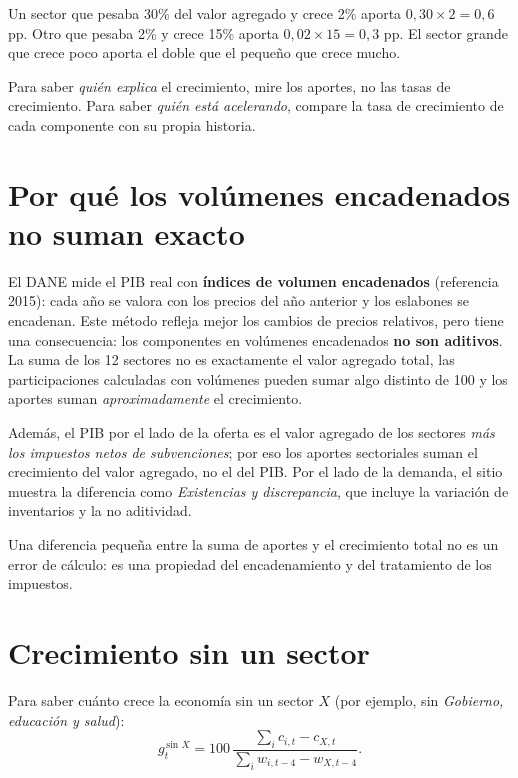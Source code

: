 \begin{dato}
Un sector que pesaba 30\% del valor agregado y crece 2\% aporta $0{,}30\times2=0{,}6$ pp. Otro que pesaba 2\% y
crece 15\% aporta $0{,}02\times15=0{,}3$ pp. El sector grande que crece poco aporta el doble que el pequeño que crece
mucho.
\end{dato}

\begin{leer}
Para saber \emph{quién explica} el crecimiento, mire los aportes, no las tasas de crecimiento. Para saber
\emph{quién está acelerando}, compare la tasa de crecimiento de cada componente con su propia historia.
\end{leer}

\section{Por qué los volúmenes encadenados no suman exacto}
\label{es:f:encadenados}
El DANE mide el PIB real con \textbf{índices de volumen encadenados} (referencia 2015): cada año se valora con los
precios del año anterior y los eslabones se encadenan. Este método refleja mejor los cambios de precios relativos,
pero tiene una consecuencia: los componentes en volúmenes encadenados \textbf{no son aditivos}. La suma de los 12
sectores no es exactamente el valor agregado total, las participaciones calculadas con volúmenes pueden sumar algo
distinto de 100 y los aportes suman \emph{aproximadamente} el crecimiento.

Además, el PIB por el lado de la oferta es el valor agregado de los sectores \emph{más los impuestos netos de
subvenciones}; por eso los aportes sectoriales suman el crecimiento del valor agregado, no el del PIB. Por el lado
de la demanda, el sitio muestra la diferencia como \emph{Existencias y discrepancia}, que incluye la variación de
inventarios y la no aditividad.

\begin{alerta}
Una diferencia pequeña entre la suma de aportes y el crecimiento total no es un error de cálculo: es una propiedad
del encadenamiento y del tratamiento de los impuestos.
\end{alerta}

\section{Crecimiento sin un sector}
Para saber cuánto crece la economía sin un sector $X$ (por ejemplo, sin \emph{Gobierno, educación y salud}):
\[
g^{\,\text{sin }X}_t=100\,\frac{\sum_i c_{i,t}-c_{X,t}}{\sum_i w_{i,t-4}-w_{X,t-4}}.
\]

